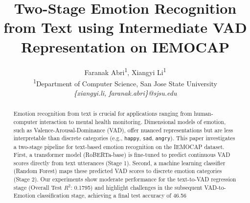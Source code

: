 \documentclass[conference]{IEEEtran}
\newcommand*{\affaddr}[1]{#1}
\newcommand*{\affmark}[1][*]{\textsuperscript{#1}}
\newcommand*{\email}[1]{\textit{#1}}
\begin{document}
\title{Two-Stage Emotion Recognition from Text using Intermediate VAD Representation on IEMOCAP}

\author{%
    Faranak Abri\affmark[1], Xiangyi Li\affmark[1]\\
    \affaddr{\affmark[1]Department of Computer Science, San Jose State University}\\
    \email{\{xiangyi.li, faranak.abri\}@sjsu.edu}\\
}

\IEEEoverridecommandlockouts

\maketitle

\begin{abstract}
Emotion recognition from text is crucial for applications ranging from human-computer interaction to mental health monitoring. Dimensional models of emotion, such as Valence-Arousal-Dominance (VAD), offer nuanced representations but are less interpretable than discrete categories (e.g., \texttt{happy}, \texttt{sad}, \texttt{angry}). This paper investigates a two-stage pipeline for text-based emotion recognition on the IEMOCAP dataset. First, a transformer model (RoBERTa-base) is fine-tuned to predict continuous VAD scores directly from text utterances (Stage 1). Second, a machine learning classifier (Random Forest) maps these predicted VAD scores to discrete emotion categories (Stage 2). Our experiments show moderate performance for the text-to-VAD regression stage (Overall Test $R^2$: 0.1795) and highlight challenges in the subsequent VAD-to-Emotion classification stage, achieving a final test accuracy of 46.56%
\end{abstract}
\end{document}
